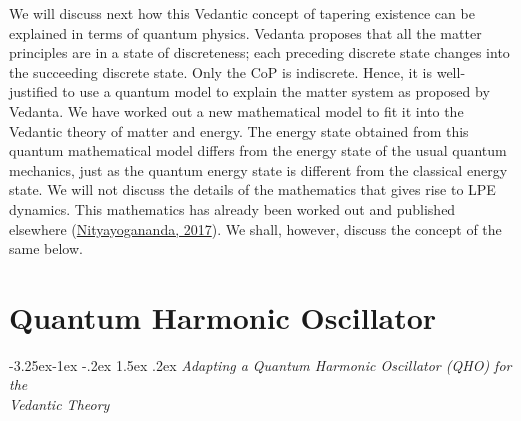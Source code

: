 \documentclass[twoside, 13pt]{article}
\makeatletter
\renewcommand\subsection{\@startsection{subsection}{2}{\z@}%
                                     {-3.25ex\@plus -1ex \@minus -.2ex}%
                                     {1.5ex \@plus .2ex}%
                                     {\normalfont\Large\bfseries}}
\makeatother
\begin{document}
{{\fontsize{12}{14}\selectfont We will discuss next how this Vedantic concept of tapering existence can be explained in terms of quantum physics. Vedanta proposes that all the matter principles are in a state of discreteness; each preceding discrete state changes into the succeeding discrete state. Only the CoP is indiscrete. Hence, it is well-justified to use a quantum model to explain the matter system as proposed by Vedanta. We have worked out a new mathematical model to fit it into the Vedantic theory of matter and energy. The energy state obtained from this quantum mathematical model differs from the energy state of the usual quantum mechanics, just as the quantum energy state is different from the classical energy state. We will not discuss the details of the mathematics that gives rise to LPE dynamics. This mathematics has already been worked out and published elsewhere (\underline{Nityayogananda, 2017}). We shall, however, discuss the concept of the same below.}

\vspace{.2cm}

{\fontsize{18}{20}\selectfont\section{Quantum Harmonic Oscillator}}\label{sec-3}

\vspace{-.3cm}

{\fontsize{8}{10}\selectfont\subsection{\textit{Adapting a Quantum Harmonic Oscillator (QHO) for the\\ Vedantic Theory}}}\label{subsec-3.1}


}
\end{document}
